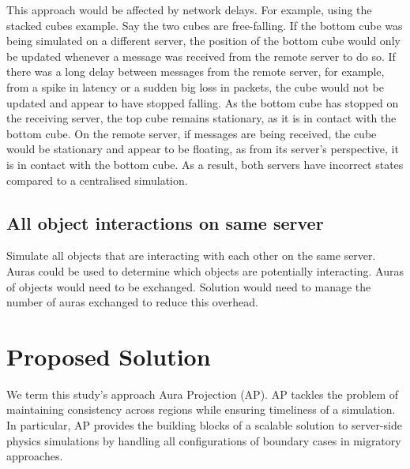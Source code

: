 
This approach would be affected by network delays. For example, using the stacked cubes example. Say the two cubes are free-falling. If the bottom cube was being simulated on a different server, the position of the bottom cube would only be updated whenever a message was received from the remote server to do so. If there was a long delay between messages from the remote server, for example, from a spike in latency or a sudden big loss in packets, the cube would not be updated and appear to have stopped falling. As the bottom cube has stopped on the receiving server, the top cube remains stationary, as it is in contact with the bottom cube. On the remote server, if messages are being received, the cube would be stationary and appear to be floating, as from its server's perspective, it is in contact with the bottom cube. As a result, both servers have incorrect states compared to a centralised simulation.


\subsection{All object interactions on same server}
Simulate all objects that are interacting with each other on the same server. Auras could be used to determine which objects are potentially interacting. Auras of objects would need to be exchanged. Solution would need to manage the number of auras exchanged to reduce this overhead.

\section{Proposed Solution}
We term this study's approach Aura Projection (AP). AP tackles the problem of maintaining consistency across regions while ensuring timeliness of a simulation. In particular, AP provides the building blocks of a scalable solution to server-side physics simulations by handling all configurations of boundary cases in migratory approaches. 

